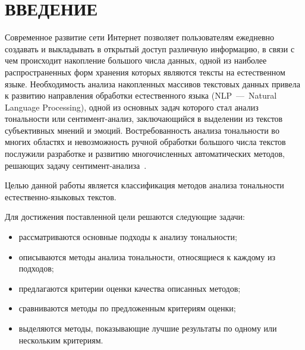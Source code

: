 \chapter*{ВВЕДЕНИЕ}

Современное развитие сети Интернет позволяет пользователям ежедневно создавать и
выкладывать в открытый доступ различную информацию, в связи с чем происходит
накопление большого числа данных, одной из наиболее распространенных форм
хранения которых являются тексты на естественном языке. Необходимость анализа
накопленных массивов текстовых данных привела к развитию направления обработки
естественного языка (NLP~---~Natural Language Processing), одной из основных
задач которого стал анализ тональности или сентимент-анализ, заключающийся в
выделении из текстов субъективных мнений и эмоций. Востребованность анализа
тональности во многих областях и невозможность ручной обработки большого числа
текстов послужили разработке и развитию многочисленных автоматических методов,
решающих задачу сентимент-анализа~\cite{article05}.

Целью данной работы является классификация методов анализа тональности
естественно-языковых текстов.

Для достижения поставленной цели решаются следующие задачи:
\begin{itemize}
    \item рассматриваются основные подходы к анализу тональности;
    \item описываются методы анализа тональности, относящиеся к каждому из подходов;
    \item предлагаются критерии оценки качества описанных методов;
    \item сравниваются методы по предложенным критериям оценки;
    \item выделяются методы, показывающие лучшие результаты по одному или
        нескольким критериям.
\end{itemize}
